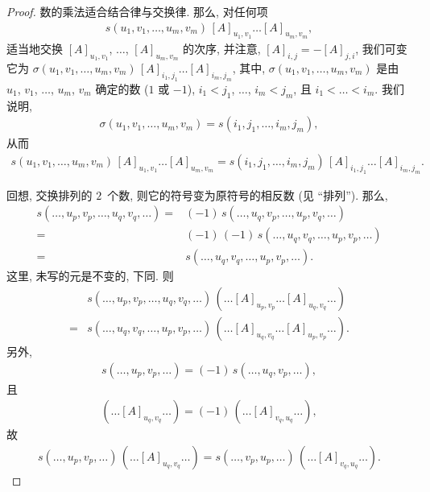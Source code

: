 \documentclass[../libro.tex]{subfiles}
\begin{document}
\begin{proof}
    数的乘法适合结合律与交换律.
    那么, 对任何项
    \begin{align*}
        s(u_1, v_1, \dots, u_m, v_m)\, [A]_{u_1,v_1} \dots [A]_{u_m,v_m},
    \end{align*}
    适当地交换
    \([A]_{u_1,v_1}\), \(\dots\), \([A]_{u_m,v_m}\)
    的次序,
    并注意, \([A]_{i,j} = -[A]_{j,i}\),
    我们可变它为 \(\sigma(u_1, v_1, \dots, u_m, v_m)\,
    [A]_{i_1,j_1} \dots [A]_{i_m,j_m}\),
    其中,
    \(\sigma(u_1, v_1, \dots, u_m, v_m)\)
    是由 \(u_1\), \(v_1\), \(\dots\), \(u_m\), \(v_m\) 确定的数
    (\(1\) 或 \(-1\)),
    \(i_1 < j_1\), \(\dots\), \(i_m < j_m\),
    且 \(i_1 < \dots < i_m\).
    我们说明,
    \begin{align*}
        \sigma(u_1, v_1, \dots, u_m, v_m) = s(i_1, j_1, \dots, i_m, j_m),
    \end{align*}
    从而
    \begin{align*}
        s(u_1, v_1, \dots, u_m, v_m)\, [A]_{u_1,v_1} \dots [A]_{u_m,v_m}
        =
        s(i_1, j_1, \dots, i_m, j_m)\, [A]_{i_1,j_1} \dots [A]_{i_m,j_m}.
    \end{align*}

    回想, 交换排列的 \(2\)~个数, 则它的符号变为原符号的相反数
    (见 ``排列'').
    那么,
    \begin{align*}
        s(\dots, u_p, v_p, \dots, u_q, v_q, \dots)
        = {} &
        (-1)\, s(\dots, u_q, v_p, \dots, u_p, v_q, \dots)
        \\
        = {} &
        (-1)\, (-1)\, s(\dots, u_q, v_q, \dots, u_p, v_p, \dots)
        \\
        = {} &
        s(\dots, u_q, v_q, \dots, u_p, v_p, \dots).
    \end{align*}
    这里, 未写的元是不变的, 下同.
    则
    \begin{align*}
        &
        s(\dots, u_p, v_p, \dots, u_q, v_q, \dots)\,
        (\dots [A]_{u_p,v_p} \dots [A]_{u_q,v_q} \dots)
        \\
        = {} &
        s(\dots, u_q, v_q, \dots, u_p, v_p, \dots)\,
        (\dots [A]_{u_q,v_q} \dots [A]_{u_p,v_p} \dots).
    \end{align*}
    另外,
    \begin{align*}
        s(\dots, u_p, v_p, \dots)
        = (-1)\, s(\dots, u_q, v_p, \dots),
    \end{align*}
    且
    \begin{align*}
        (\dots [A]_{u_q,v_q} \dots)
        = (-1)\, (\dots [A]_{v_q,u_q} \dots),
    \end{align*}
    故
    \begin{align*}
        s(\dots, u_p, v_p, \dots)\, (\dots [A]_{u_q,v_q} \dots)
        = s(\dots, v_p, u_p, \dots)\, (\dots [A]_{v_q,u_q} \dots).
    \end{align*}


\end{proof}
\end{document}
